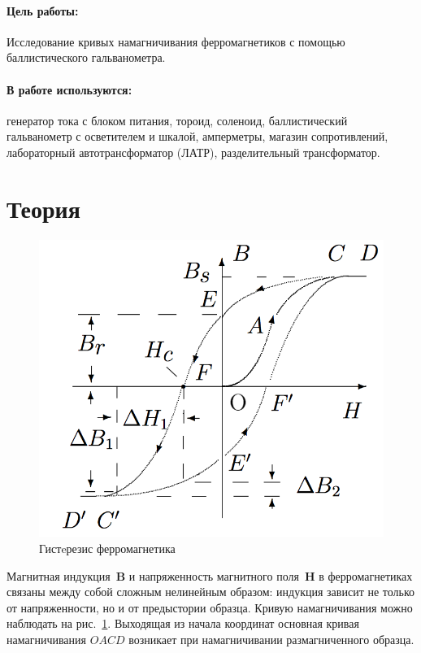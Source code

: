 \documentclass{letnab}
\begin{document}


\paragraph{Цель работы:} Исследование кривых намагничивания ферромагнетиков с помощью баллистического гальванометра.

\paragraph{В работе используются:} генератор тока с блоком питания, тороид, соленоид, баллистический гальванометр с осветителем и шкалой, амперметры, магазин сопротивлений, лабораторный автотрансформатор (ЛАТР), разделительный трансформатор.

\section{Теория}  

\begin{figure}\vspace{-.9cm}
\includegraphics[width=.95\linewidth]{magnet}
\caption{Гистeрезис ферромагнетика}
\label{fig:magnet}
\end{figure} 

Магнитная индукция~$\mathbf{B}$ и напряженность магнитного поля~$\mathbf{H}$ в ферромагнетиках связаны между собой сложным нелинейным образом: индукция зависит не только от напряженности, но и от предыстории образца. Кривую намагничивания можно наблюдать на рис.~\ref{fig:magnet}. Выходящая из начала координат \textsf{основная кривая намагничивания} $OACD$ возникает при намагничивании размагниченного образца.
\end{document}
